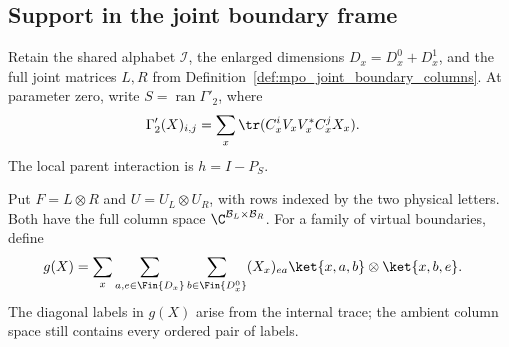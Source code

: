 
\subsection{Support in the joint boundary frame}
\label{sec:mpo_joint_frame_reduction}

Retain the shared alphabet $\mathcal I$, the enlarged dimensions
$D_x=D_x^0+D_x^1$, and the full joint matrices $L,R$ from
Definition~\ref{def:mpo_joint_boundary_columns}. At parameter zero, write
$S=\operatorname{ran}\Gamma'_2$, where
\begin{align}
    \Gamma'_2(X)_{i,j}
     & =\sum_x\tr(C_x^iV_xV_x^*C_x^jX_x).
    \label{eq:mpo_joint_full_trace}
\end{align}
The local parent interaction is $h=I-P_S$.

\begin{definition}
    \label{def:mpo_joint_full_frame}
    \leanok
    Put $F=L\otimes R$ and $U=U_L\otimes U_R$, with rows indexed
    by the two physical letters. Both have the full column space
    $\C^{\mathcal B_L\times\mathcal B_R}$. For a family of virtual
    boundaries, define
    \begin{align}
        g(X) & =\sum_x\sum_{a,e\in\Fin{D_x}}
        \sum_{b\in\Fin{D_x^0}}(X_x)_{ea}
        \ket{x,a,b}\otimes\ket{x,b,e}.
        \label{eq:mpo_joint_frame_coefficients}
    \end{align}
    The diagonal labels in $g(X)$ arise from the internal trace;
    the ambient column space still contains every ordered pair of labels.
\end{definition}

